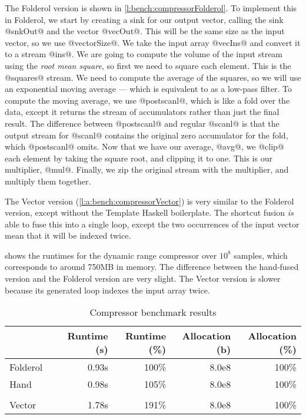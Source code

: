 The Folderol version is shown in \cref{l:bench:compressorFolderol}.
To implement this in Folderol, we start by creating a sink for our output vector, calling the sink @snkOut@ and the vector @vecOut@.
This will be the same size as the input vector, so we use @vectorSize@.
We take the input array @vecIns@ and convert it to a stream @ins@.
We are going to compute the volume of the input stream using the \emph{root mean square}, so first we need to square each element.
This is the @squares@ stream.
We need to compute the average of the squares, so we will use an exponential moving average --- which is equivalent to as a low-pass filter.
To compute the moving average, we use @postscanl@, which is like a fold over the data, except it returns the stream of accumulators rather than just the final result.
The difference between @postscanl@ and regular @scanl@ is that the output stream for @scanl@ contains the original zero accumulator for the fold, which @postscanl@ omits.
Now that we have our average, @avg@, we @clip@ each element by taking the square root, and clipping it to one. This is our multiplier, @mul@.
Finally, we zip the original stream with the multiplier, and multiply them together.

The Vector version (\cref{l:a:bench:compressorVector}) is very similar to the Folderol version, except without the Template Haskell boilerplate.
The shortcut fusion \emph{is} able to fuse this into a single loop, except the two occurrences of the input vector mean that it will be indexed twice.

 shows the runtimes for the dynamic range compressor over $10^8$ samples, which corresponds to around 750MB in memory.
The difference between the hand-fused version and the Folderol version are very slight. 
The Vector version is slower because its generated loop indexes the input array twice.

\begin{table}
\begin{center}
\begin{tabular}{ll|rrrr}
& & Runtime (s)  & Runtime (\%) & Allocation (b) & Allocation (\%) \\
\hline
Folderol &          & 0.93s &   100\% & 8.0e8 & 100\% \\
Hand     &          & 0.98s &   105\% & 8.0e8 & 100\% \\
&&&\\
Vector &            & 1.78s &   191\% & 8.0e8 & 100\%\\
\end{tabular}
\end{center}
\caption[Compressor benchmark results]{Compressor benchmark results}
\label{table:bench:compressor}
\end{table}


